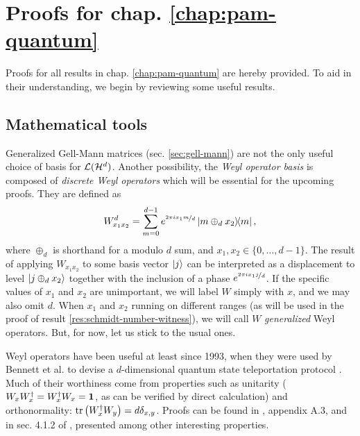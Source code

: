 \chapter{Proofs for chap. \ref{chap:pam-quantum}}
\label{ap:pam-quantum}

Proofs for all results in chap. \ref{chap:pam-quantum} are hereby provided. To aid in their understanding, we begin by reviewing some useful results.

\section{Mathematical tools}
\label{sec:ap-a-mathematical-tools}

    Generalized Gell-Mann matrices (sec. \ref{sec:gell-mann}) are not the only useful choice of basis for $\mathcal{L}(\mathcal{H}^{d})$. Another possibility, the \emph{Weyl operator basis} \cite{bertlmann_2008_bloch} is composed of \emph{discrete Weyl operators} which will be essential for the upcoming proofs. They are defined as
    \begin{equation}
        W_{x_1 x_2}^d = \sum_{m = 0}^{d-1} e^{\nicefrac{2 \pi i x_1 m}{d}} \ketbra{m \oplus_d x_2}{m} ,
        \label{eq:weyl-operators}
    \end{equation}
    where $\oplus_d$ is shorthand for a modulo $d$ sum, and $x_1, x_2 \in \{0, \ldots, d-1 \}$. The result of applying $W_{x_1 x_2}$ to some basis vector $\ket{j}$ can be interpreted as a displacement to level $\ket{j \oplus_d x_2}$ together with the inclusion of a phase $e^{\nicefrac{2 \pi i x_1 j}{d}}$. If the specific values of $x_1$ and $x_2$ are unimportant, we will label $W$ simply with $x$, and we may also omit $d$. When $x_1$ and $x_2$ running on different ranges (as will be used in the proof of result \ref{res:schmidt-number-witness}), we will call $W$ \emph{generalized} Weyl operators. But, for now, let us stick to the usual ones.

    Weyl operators have been useful at least since 1993, when they were used by Bennett et al. to devise a $d$-dimensional quantum state teleportation protocol \cite{bennett_1993_teleporting}. Much of their worthiness come from properties such as unitarity ($W_x W_x^\dagger = W_x^\dagger W_x = \mathbf{1}$, as can be verified by direct calculation) and orthonormality: $\text{tr}\left( W_{x}^\dagger W_{y} \right) = d \delta_{x, y}$. Proofs can be found in \cite{bertlmann_2008_bloch}, appendix A.3, and in sec. 4.1.2 of \cite{watrous_book_2018}, presented among other interesting properties.

